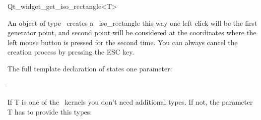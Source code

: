 
\begin{ccRefClass}{Qt_widget_get_iso_rectangle<T>}

\ccDefinition
An object of type \ccRefName\ creates a \cgal\ iso\_rectangle this way
one left click will be the first generator point, and second point
will be considered at the coordinates where the left mouse button is
pressed for the second time.
You can always cancel the creation process by pressing the ESC key.


\ccParameters
The full template declaration of  states one parameter:
\begin{tabbing}
 \=\\
\end{tabbing}

If T is one of the \cgal\ kernels you don't need additional types. If
not, the parameter T has to provide this types:

\ccTypes
{}

\ccInheritsFrom
{}

\ccGlue

\ccCreation
{}


\end{ccRefClass}

